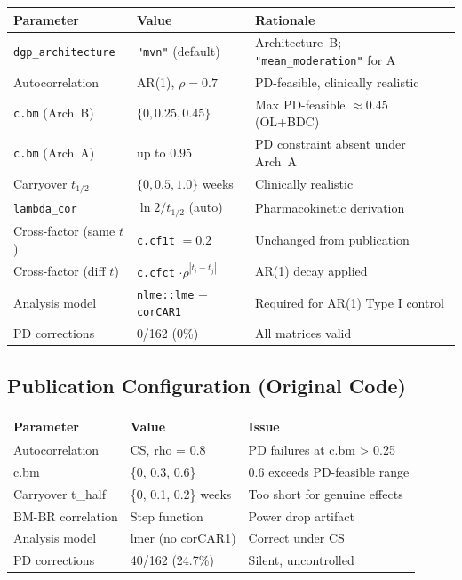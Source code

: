 \documentclass[11pt]{article}
\begin{document}
\begin{table}[h]
\centering
\begin{tabular}{lll}
\toprule
Parameter & Value & Rationale \\
\midrule
\texttt{dgp\_architecture} & \texttt{"mvn"} (default) & Architecture~B; \texttt{"mean\_moderation"} for A \\
Autocorrelation & AR(1), $\rho = 0.7$ & PD-feasible, clinically realistic \\
\texttt{c.bm} (Arch~B) & $\{0, 0.25, 0.45\}$ & Max PD-feasible $\approx 0.45$ (OL+BDC) \\
\texttt{c.bm} (Arch~A) & up to $0.95$ & PD constraint absent under Arch~A \\
Carryover $t_{1/2}$ & $\{0, 0.5, 1.0\}$ weeks & Clinically realistic \\
\texttt{lambda\_cor} & $\ln 2 / t_{1/2}$ (auto) & Pharmacokinetic derivation \\
Cross-factor (same $t$) & \texttt{c.cf1t} $= 0.2$ & Unchanged from publication \\
Cross-factor (diff $t$) & \texttt{c.cfct} $\cdot \rho^{|t_i-t_j|}$ & AR(1) decay applied \\
Analysis model & \texttt{nlme::lme} + \texttt{corCAR1} & Required for AR(1) Type I control \\
PD corrections & 0/162 (0\%) & All matrices valid \\
\bottomrule
\end{tabular}
\end{table}

\subsection{Publication Configuration (Original Code)}

\begin{table}[h]
\centering
\begin{tabular}{lll}
\toprule
Parameter & Value & Issue \\
\midrule
Autocorrelation & CS, rho = 0.8 & PD failures at c.bm > 0.25 \\
c.bm & \{0, 0.3, 0.6\} & 0.6 exceeds PD-feasible range \\
Carryover t\_half & \{0, 0.1, 0.2\} weeks & Too short for genuine effects \\
BM-BR correlation & Step function & Power drop artifact \\
Analysis model & lmer (no corCAR1) & Correct under CS \\
PD corrections & 40/162 (24.7\%) & Silent, uncontrolled \\
\bottomrule
\end{tabular}
\end{table}
\end{document}
